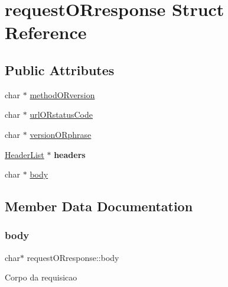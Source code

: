 \hypertarget{structrequest_o_rresponse}{}\section{request\+O\+Rresponse Struct Reference}
\label{structrequest_o_rresponse}
\subsection*{Public Attributes}
\begin{DoxyCompactItemize}
\item 
char $\ast$ \hyperlink{structrequest_o_rresponse_a21c4ad086149cd9bbe73fc0b63f08414}{method\+O\+Rversion}
\item 
char $\ast$ \hyperlink{structrequest_o_rresponse_a4c5ea7fd41d03df0551e6a106da90e53}{url\+O\+Rstatus\+Code}
\item 
char $\ast$ \hyperlink{structrequest_o_rresponse_a90f496e16fb4077741e610edd1ba0185}{version\+O\+Rphrase}
\item 
\mbox{\label{structrequest_o_rresponse_ac3d8d92695da7b13b9009fc6960e3849}} 
\hyperlink{structheader_list}{Header\+List} $\ast$ {\bfseries headers}
\item 
char $\ast$ \hyperlink{structrequest_o_rresponse_a0bd4bfb8939e225276d670609d86490b}{body}
\end{DoxyCompactItemize}


\subsection{Member Data Documentation}
\mbox{\label{structrequest_o_rresponse_a0bd4bfb8939e225276d670609d86490b}} 
\subsubsection{\texorpdfstring{body}{body}}
{\footnotesize\ttfamily char$\ast$ request\+O\+Rresponse\+::body}

Corpo da requisicao \mbox{\label{structrequest_o_rresponse_a21c4ad086149cd9bbe73fc0b63f08414}} 
